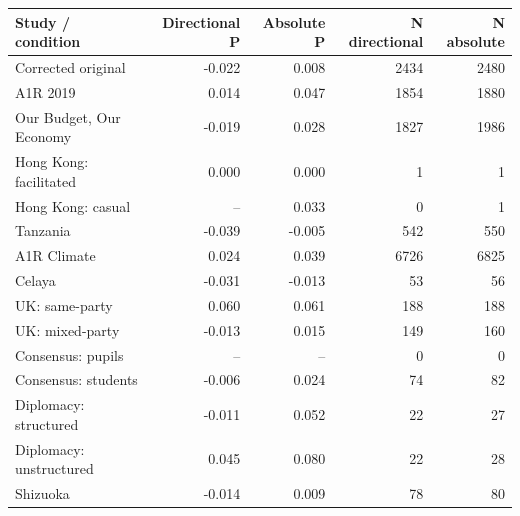 
\begin{tabular}{lrrrr}
\toprule
Study / condition & Directional P & Absolute P & N directional & N absolute\\
\midrule
Corrected original & -0.022 & 0.008 & 2434 & 2480\\
A1R 2019 & 0.014 & 0.047 & 1854 & 1880\\
Our Budget, Our Economy & -0.019 & 0.028 & 1827 & 1986\\
Hong Kong: facilitated & 0.000 & 0.000 & 1 & 1\\
Hong Kong: casual & -- & 0.033 & 0 & 1\\
\addlinespace
Tanzania & -0.039 & -0.005 & 542 & 550\\
A1R Climate & 0.024 & 0.039 & 6726 & 6825\\
Celaya & -0.031 & -0.013 & 53 & 56\\
UK: same-party & 0.060 & 0.061 & 188 & 188\\
UK: mixed-party & -0.013 & 0.015 & 149 & 160\\
\addlinespace
Consensus: pupils & -- & -- & 0 & 0\\
Consensus: students & -0.006 & 0.024 & 74 & 82\\
Diplomacy: structured & -0.011 & 0.052 & 22 & 27\\
Diplomacy: unstructured & 0.045 & 0.080 & 22 & 28\\
Shizuoka & -0.014 & 0.009 & 78 & 80\\
\bottomrule
\end{tabular}
